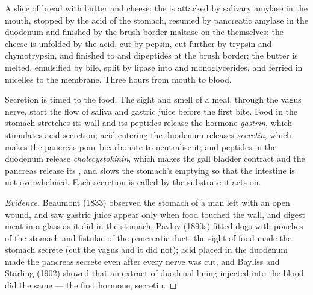 \begin{example}\label{ex:b1:digestion-absorption:meal}
A slice of bread with butter and cheese: the  is attacked by
salivary amylase in the mouth, stopped by the acid of the stomach,
resumed by pancreatic amylase in the duodenum and finished by the
brush-border maltase on the  themselves; the cheese 
is unfolded by the acid, cut by pepsin, cut further by trypsin and
chymotrypsin, and finished to  and dipeptides at the brush
border; the butter is melted, emulsified by bile, split by lipase into
 and monoglycerides, and ferried in micelles to the
membrane. Three hours from mouth to blood.
\end{example}

\begin{proposition}\label{prop:b1:digestion-absorption:control}
Secretion is timed to the food. The sight and smell of a meal, through
the vagus nerve, start the flow of saliva and gastric juice before the
first bite. Food in the stomach stretches its wall and its peptides
release the hormone \emph{gastrin}, which stimulates acid secretion;
acid entering the duodenum releases \emph{secretin}, which makes the
pancreas pour bicarbonate to neutralise it;  and peptides in the
duodenum release \emph{cholecystokinin}, which makes the gall bladder
contract and the pancreas release its , and slows the stomach's
emptying so that the intestine is not overwhelmed. Each secretion is
called by the substrate it acts on.
\end{proposition}
\begin{proof}[Evidence]
Beaumont (1833) observed the stomach of a man left with an open
wound, and saw gastric juice appear only when food touched the wall,
and digest meat in a glass as it did in the stomach. Pavlov (1890s)
fitted dogs with pouches of the stomach and fistulae of the pancreatic
duct: the sight of food made the stomach secrete (cut the vagus and it
did not); acid placed in the duodenum made the pancreas secrete even
after every nerve was cut, and Bayliss and Starling (1902) showed that
an extract of duodenal lining injected into the blood did the same
--- the first hormone, secretin.
\end{proof}

